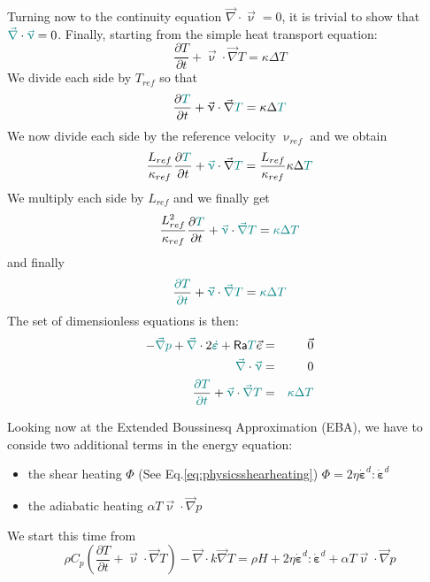Turning now to the continuity equation $\vec\nabla \cdot\vec\upnu = 0$,
it is trivial to show that  ${\color{teal} \vec\nabla } \cdot  {\color{teal}\vec\upnu} = 0$.
Finally, starting from the simple heat transport equation:
\[
\frac{\partial T}{\partial t} + \vec\upnu\cdot\vec\nabla T = \kappa \Delta T
\]
We divide each side by $T_{ref}$ so that 
\[
\frac{\partial {\color{teal}T}}{\partial t} + \vec\upnu\cdot\vec\nabla {\color{teal}T} = \kappa \Delta {\color{teal}T}
\]
We now divide each side by the reference velocity $\upnu_{ref}$ 
and we obtain
\[
\frac{L_{ref}}{\kappa_{ref}} \frac{\partial {\color{teal}T}}{\partial t} 
+ {\color{teal} \vec\upnu} \cdot\vec\nabla {\color{teal}T} 
=  \frac{L_{ref}}{\kappa_{ref}}  \kappa \Delta {\color{teal}T}
\]
We multiply each side by $L_{ref}$ and we finally get
\[
\frac{L_{ref}^2}{\kappa_{ref}} 
\frac{\partial {\color{teal}T}}{\partial t}
+ {\color{teal} \vec\upnu} \cdot  {\color{teal}\vec\nabla} {\color{teal}T} =  {\color{teal} \kappa} {\color{teal}\Delta} {\color{teal}T}
\]
and finally
\[
\frac{ {\color{teal} \partial T}}{ {\color{teal} \partial t}} 
+ {\color{teal} \vec\upnu} \cdot  {\color{teal}\vec\nabla} {\color{teal}T} =  {\color{teal} \kappa} {\color{teal}\Delta} {\color{teal}T}
\]
The set of dimensionless equations is then:
\begin{eqnarray}
-{\color{teal} \vec\nabla} {\color{teal}p} + {\color{teal} \vec\nabla} \cdot 2  {\color{teal} \dot{\bm\varepsilon}}
+ {\mathsf{Ra}}  {\color{teal} T} \vec{e} &=& \vec{0} \\
{\color{teal} \vec\nabla } \cdot  {\color{teal}\vec\upnu} &=& 0 \\
\frac{ {\color{teal} \partial T}}{ {\color{teal} \partial t}} 
+ {\color{teal} \vec\upnu} \cdot  {\color{teal}\vec\nabla} {\color{teal}T} &=&  {\color{teal} \kappa} {\color{teal}\Delta} {\color{teal}T}
\end{eqnarray}

Looking now at the Extended Boussinesq Approximation (EBA), we have to conside two additional terms in the 
energy equation:
\begin{itemize}
\item the shear heating $\Phi$ (See Eq.\eqref{eq:physicsshearheating}) 
$\Phi = 2 \eta  \dot{\bm \varepsilon}^d : \dot{\bm \varepsilon}^d$ 
\item the adiabatic heating $\alpha T \vec\upnu\cdot\vec\nabla p$
\end{itemize}
We start this time from 
\[
\rho C_p \left(\frac{\partial T}{\partial t} + \vec \upnu\cdot\vec\nabla T\right)
- \vec\nabla\cdot k\vec\nabla T 
= \rho H + 2\eta\dot{\bm \varepsilon}^d : \dot{\bm \varepsilon}^d 
+\alpha T  \vec\upnu \cdot \vec\nabla p 
\]

